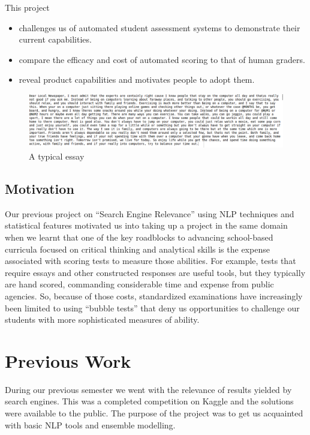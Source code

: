 \documentclass[BTech]{nitkdiss}
\begin{document}
This project
\begin{itemize}
    \item challenges us of automated student assessment systems to demonstrate their current capabilities.
    \item compare the efficacy and cost of automated scoring to that of human graders.
    \item reveal product capabilities and motivates people to adopt them.
\end{itemize}
\begin{figure}[h!]
\centering
\includegraphics[scale=0.50]{snapshot2.png}
\caption{A typical essay}
\label{fig:Essay}
\end{figure}

\section{Motivation}
Our previous project on “Search Engine Relevance” using NLP techniques and statistical features motivated us into taking up a project in the same domain when we learnt that one of the key roadblocks to advancing school-based curricula focused on critical thinking and analytical skills is the expense associated with scoring tests to measure those abilities.  For example, tests that require essays and other constructed responses are useful tools, but they typically are hand scored, commanding considerable time and expense from public agencies.  So, because of those costs, standardized examinations have increasingly been limited to using “bubble tests” that deny us opportunities to challenge our students with more sophisticated measures of ability.

\chapter{Previous Work}
During our previous semester we went with the relevance of results yielded by search engines. This was a completed competition on Kaggle and the solutions were available to the public. The purpose of the project was to get us acquainted with basic NLP tools and ensemble modelling.\\
\end{document}
